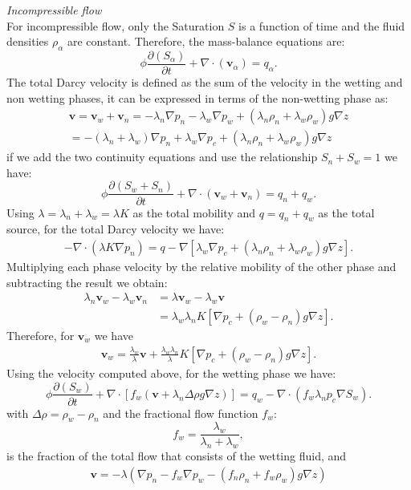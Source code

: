 \documentclass[12pt]{article}
\begin{document}
\emph{Incompressible flow}\\
For incompressible flow, only the Saturation $S$ is a function of time and the fluid densities $\rho_{\alpha}$ are constant. Therefore, the mass-balance equations are:
\begin{equation}
 \phi\frac{\partial( {S}_{\alpha})}{\partial t}+\nabla \cdot ( \mathbf{v}_{\alpha})= q_{\alpha}.
\end{equation}
The total Darcy velocity is defined as the sum of the velocity in the wetting and non wetting phases, it can be expressed in terms of the non-wetting phase as:
\begin{align*}
\mathbf{v}=\mathbf{v}_w+\mathbf{v}_n=-\lambda_{n}\nabla p_n-\lambda_{w}\nabla p_w+(\lambda_n \rho_n+\lambda_w\rho_w)g\nabla z\\
=-(\lambda_n+\lambda_w)\nabla p_n+\lambda_w\nabla p_c+(\lambda_n \rho_n+\lambda_w\rho_w)g\nabla z
\end{align*}
if we add the two continuity equations and use the relationship $S_n+S_w=1$ we have:
\begin{equation*}
 \phi\frac{\partial( {S}_{w}+S_n)}{\partial t}+\nabla \cdot ( \mathbf{v}_{w}+\mathbf{v}_n)= q_{n}+q_w.
\end{equation*}
Using $\lambda=\lambda_n+\lambda_w=\lambda K$ as the total mobility and $q=q_n+q_w$ as the total source, for the total Darcy velocity we have:
\begin{align*}
-\nabla \cdot (\lambda K\nabla p_n)=q-\nabla[\lambda_w\nabla p_c+(\lambda_n\rho_n+\lambda_w\rho_w)g\nabla z].
\end{align*}
Multiplying each phase velocity by the relative mobility of the other phase and subtracting the result we obtain:
\begin{align*}
\lambda_n\mathbf{v}_w-\lambda_w\mathbf{v}_n&=\lambda\mathbf{v}_w-\lambda_w\mathbf{v}\\
&=\lambda_w\lambda_n K[\nabla p_c+(\rho_w-\rho_n)g\nabla z].
\end{align*}
Therefore, for $\mathbf{v}_w$ we have
\begin{align*}
\mathbf{v}_w=\frac{\lambda_w}{\lambda}\mathbf{v}+\frac{\lambda_w\lambda_n}{\lambda} K[\nabla p_c+(\rho_w-\rho_n)g\nabla z].
\end{align*}
Using the velocity computed above, for the wetting phase we have:
\begin{equation}\label{eq:sat}
 \phi\frac{\partial( {S}_{w})}{\partial t}+\nabla \cdot [f_w( \mathbf{v}+\lambda_n\Delta  \rho g\nabla z)]= q_w-\nabla \cdot(f_w\lambda_np_c\nabla S_w).
\end{equation}
with $\Delta \rho= \rho_w-\rho_n$ and the fractional flow function $f_w$:
$$f_w=\frac{\lambda_{w}}{\lambda_n+\lambda_w},$$
is the fraction of the total flow that consists of the wetting fluid, and
\begin{align*}
\mathbf{v}=-\lambda(\nabla p_n-f_w\nabla p_w-(f_n \rho_n+f_w\rho_w)g\nabla z)\\
\end{align*}
\end{document}
